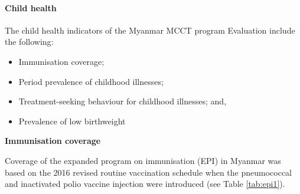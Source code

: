 \documentclass[12pt,a4paper]{article}
\let\oldparagraph\paragraph
\renewcommand{\paragraph}[1]{\oldparagraph{#1}\mbox{}}
\begin{document}
\hypertarget{chealth}{%
\paragraph{Child health}\label{chealth}}

The child health indicators of the Myanmar MCCT program Evaluation include the following:

\begin{itemize}
\item
  Immunisation coverage;
\item
  Period prevalence of childhood illnesses;
\item
  Treatment-seeking behaviour for childhood illnesses; and,
\item
  Prevalence of low birthweight
\end{itemize}

\newpage

\textbf{Immunisation coverage}

Coverage of the expanded program on immunisation (EPI) in Myanmar was based on the 2016 revised routine vaccination schedule when the pneumococcal and inactivated polio vaccine injection were introduced \citep{MoHMyanmar:2016wp} (see Table \ref{tab:epi1}).
\end{document}
